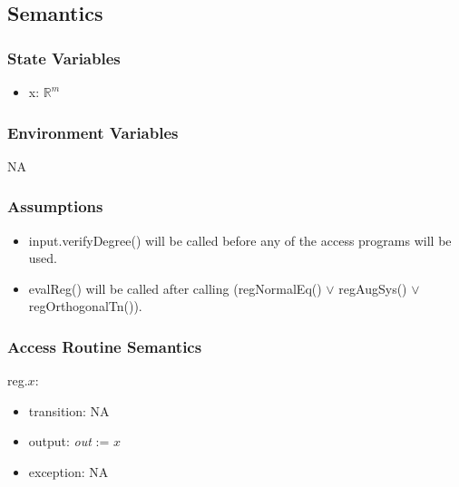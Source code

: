 \documentclass[12pt, titlepage]{article}
\begin{document}
\subsection{Semantics}

\subsubsection{State Variables}
\begin{itemize}

\item x: $\mathbb{R}^m$\\
\end{itemize}



\subsubsection{Environment Variables}

NA

\subsubsection{Assumptions}
\begin{itemize}
\item input.verifyDegree() will be called before any of the access programs 
will be used.
\item evalReg() will be called after calling (regNormalEq() $\lor$  
regAugSys() $\lor$ regOrthogonalTn()).
\end{itemize}
\subsubsection{Access Routine Semantics}

\noindent reg.$x$:
\begin{itemize}
	\item transition: NA	
	\item output: \textit{out} := $x$
	\item exception: NA
\end{itemize}
\end{document}

